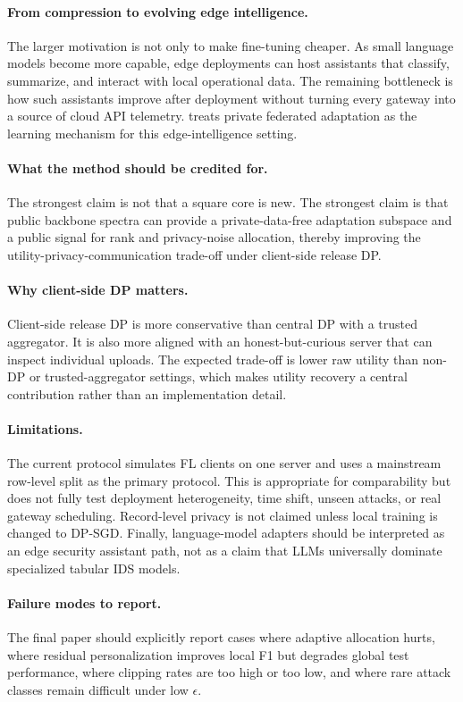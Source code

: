 \paragraph{From compression to evolving edge intelligence.}
The larger motivation is not only to make fine-tuning cheaper. As small language models become more capable, edge deployments can host assistants that classify, summarize, and interact with local operational data. The remaining bottleneck is how such assistants improve after deployment without turning every gateway into a source of cloud API telemetry. \method treats private federated adaptation as the learning mechanism for this edge-intelligence setting.

\paragraph{What the method should be credited for.}
The strongest claim is not that a square core is new. The strongest claim is that public backbone spectra can provide a private-data-free adaptation subspace and a public signal for rank and privacy-noise allocation, thereby improving the utility-privacy-communication trade-off under client-side release DP.

\paragraph{Why client-side DP matters.}
Client-side release DP is more conservative than central DP with a trusted aggregator. It is also more aligned with an honest-but-curious server that can inspect individual uploads. The expected trade-off is lower raw utility than non-DP or trusted-aggregator settings, which makes utility recovery a central contribution rather than an implementation detail.

\paragraph{Limitations.}
The current protocol simulates FL clients on one server and uses a mainstream row-level split as the primary \dataset protocol. This is appropriate for comparability but does not fully test deployment heterogeneity, time shift, unseen attacks, or real gateway scheduling. Record-level privacy is not claimed unless local training is changed to DP-SGD. Finally, language-model adapters should be interpreted as an edge security assistant path, not as a claim that LLMs universally dominate specialized tabular IDS models.

\paragraph{Failure modes to report.}
The final paper should explicitly report cases where adaptive allocation hurts, where residual personalization improves local F1 but degrades global test performance, where clipping rates are too high or too low, and where rare attack classes remain difficult under low $\epsilon$.
